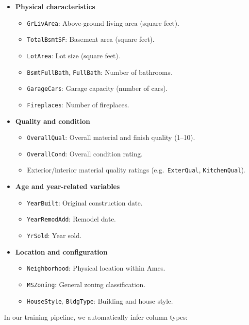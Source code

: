 \documentclass[11pt,a4paper]{article}
\begin{document}
\begin{itemize}[leftmargin=*]
    \item \textbf{Physical characteristics}
    \begin{itemize}
        \item \texttt{GrLivArea}: Above-ground living area (square feet).
        \item \texttt{TotalBsmtSF}: Basement area (square feet).
        \item \texttt{LotArea}: Lot size (square feet).
        \item \texttt{BsmtFullBath}, \texttt{FullBath}: Number of bathrooms.
        \item \texttt{GarageCars}: Garage capacity (number of cars).
        \item \texttt{Fireplaces}: Number of fireplaces.
    \end{itemize}
    \item \textbf{Quality and condition}
    \begin{itemize}
        \item \texttt{OverallQual}: Overall material and finish quality (1--10).
        \item \texttt{OverallCond}: Overall condition rating.
        \item Exterior/interior material quality ratings (e.g.\ \texttt{ExterQual}, \texttt{KitchenQual}).
    \end{itemize}
    \item \textbf{Age and year-related variables}
    \begin{itemize}
        \item \texttt{YearBuilt}: Original construction date.
        \item \texttt{YearRemodAdd}: Remodel date.
        \item \texttt{YrSold}: Year sold.
    \end{itemize}
    \item \textbf{Location and configuration}
    \begin{itemize}
        \item \texttt{Neighborhood}: Physical location within Ames.
        \item \texttt{MSZoning}: General zoning classification.
        \item \texttt{HouseStyle}, \texttt{BldgType}: Building and house style.
    \end{itemize}
\end{itemize}

In our training pipeline, we automatically infer column types:
\end{document}
